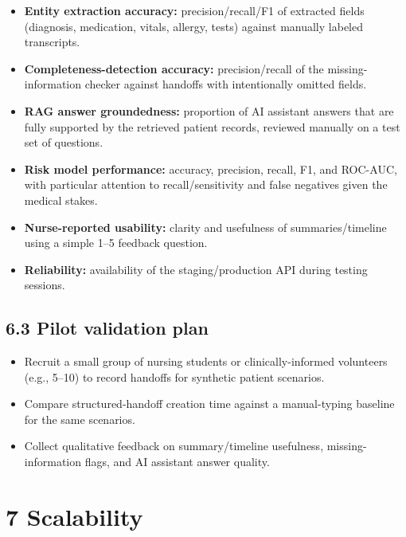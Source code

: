 \documentclass[
]{article}
\begin{document}
\begin{itemize}
\item
  \textbf{Entity extraction accuracy:} precision/recall/F1 of extracted
  fields (diagnosis, medication, vitals, allergy, tests) against
  manually labeled transcripts.
\item
  \textbf{Completeness-detection accuracy:} precision/recall of the
  missing-information checker against handoffs with intentionally
  omitted fields.
\item
  \textbf{RAG answer groundedness:} proportion of AI assistant answers
  that are fully supported by the retrieved patient records, reviewed
  manually on a test set of questions.
\item
  \textbf{Risk model performance:} accuracy, precision, recall, F1, and
  ROC-AUC, with particular attention to recall/sensitivity and false
  negatives given the medical stakes.
\item
  \textbf{Nurse-reported usability:} clarity and usefulness of
  summaries/timeline using a simple 1--5 feedback question.
\item
  \textbf{Reliability:} availability of the staging/production API
  during testing sessions.
\end{itemize}

\subsection{6.3 Pilot validation plan
}\label{pilot-validation-plan-high-level}

\begin{itemize}
\item
  Recruit a small group of nursing students or clinically-informed
  volunteers (e.g., 5--10) to record handoffs for synthetic patient
  scenarios.
\item
  Compare structured-handoff creation time against a manual-typing
  baseline for the same scenarios.
\item
  Collect qualitative feedback on summary/timeline usefulness,
  missing-information flags, and AI assistant answer quality.
\end{itemize}

\section{7 Scalability}\label{scalability}
\end{document}
